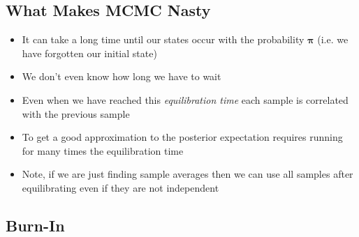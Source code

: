 
\begin{slide}
\section{What Makes MCMC Nasty}

\begin{PauseHighLight}
  \begin{itemize}
  \item It can take a long time until our states occur with the
    probability $\bm{\pi}$ (i.e. we have forgotten our initial
    state)\pause
  \item We don't even know how long we have to wait\pause
  \item Even when we have reached this \textit{equilibration time} each
    sample is correlated with the previous sample\pause
  \item To get a good approximation to the posterior expectation
    requires running for many times the equilibration time\pause
  \item Note, if we are just finding sample averages then we can use all
    samples after equilibrating even if they are not independent\pause
  \end{itemize}
\end{PauseHighLight}

\end{slide}



\begin{slide}
\section[-2]{Burn-In}
\pb
\pause
{}
\begin{center}
  \pause
\end{center}
\end{slide}



